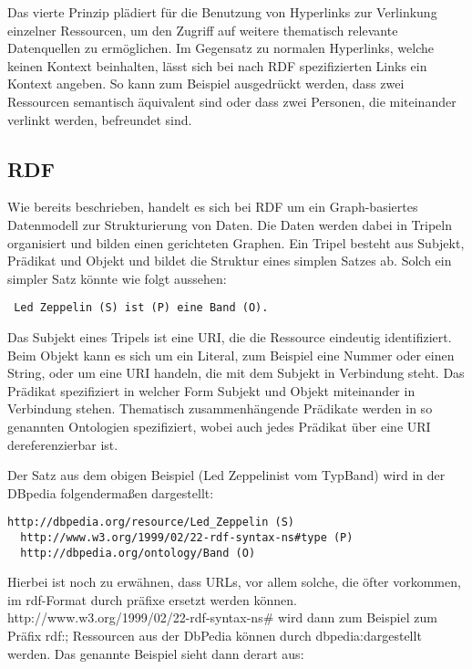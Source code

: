Das vierte Prinzip plädiert für die Benutzung von Hyperlinks zur Verlinkung einzelner Ressourcen, um den Zugriff auf weitere thematisch relevante Datenquellen zu ermöglichen. Im Gegensatz zu normalen Hyperlinks, welche keinen Kontext beinhalten, lässt sich bei nach RDF spezifizierten Links ein Kontext angeben. So kann zum Beispiel ausgedrückt werden, dass zwei Ressourcen semantisch äquivalent sind oder dass zwei Personen, die miteinander verlinkt werden, befreundet sind.


\subsection{RDF}

Wie bereits beschrieben, handelt es sich bei RDF um ein Graph-basiertes Datenmodell zur Strukturierung von Daten. Die Daten werden dabei in Tripeln organisiert und bilden einen gerichteten Graphen. Ein Tripel besteht aus Subjekt, Prädikat und Objekt und bildet die Struktur eines simplen Satzes ab. Solch ein simpler Satz könnte wie folgt aussehen:

\begin{lstlisting}
 Led Zeppelin (S) ist (P) eine Band (O).
\end{lstlisting}


Das Subjekt eines Tripels ist eine URI, die die Ressource eindeutig identifiziert. Beim Objekt kann es sich um ein Literal, zum Beispiel eine Nummer oder einen String, oder um eine URI handeln, die mit dem Subjekt in Verbindung steht. Das Prädikat spezifiziert in welcher Form Subjekt und Objekt miteinander in Verbindung stehen. Thematisch zusammenhängende Prädikate werden in so genannten Ontologien spezifiziert, wobei auch jedes Prädikat über eine URI dereferenzierbar ist.

Der Satz aus dem obigen Beispiel (\glqq Led Zeppelin\grqq ist vom \glqq Typ\grqq \glqq Band\grqq) wird in der DBpedia folgendermaßen dargestellt\cite{dbpedia_led_zeppelin}:

\begin{lstlisting}
http://dbpedia.org/resource/Led_Zeppelin (S) 
  http://www.w3.org/1999/02/22-rdf-syntax-ns#type (P)
  http://dbpedia.org/ontology/Band (O)
\end{lstlisting}

Hierbei ist noch zu erwähnen, dass URLs, vor allem solche, die öfter vorkommen, im rdf-Format durch präfixe ersetzt werden können. http://www.w3.org/1999/02/22-rdf-syntax-ns\# wird dann zum Beispiel zum Präfix \glqq rdf:\grqq; Ressourcen aus der DbPedia können durch \glqq dbpedia:\grqq dargestellt werden.
Das genannte Beispiel sieht dann derart aus:

